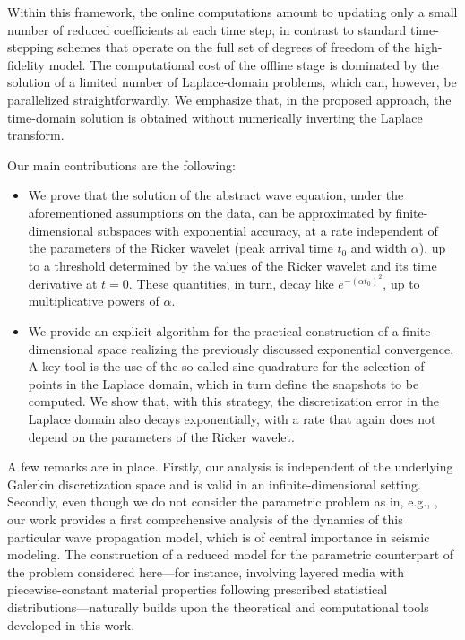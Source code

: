 Within this framework, the online computations amount to updating only a small
number of reduced coefficients at each time step, in contrast to standard
time-stepping schemes that operate on the full set of degrees of freedom of the
high-fidelity model.
The computational cost of the offline stage is dominated by the solution of a
limited number of Laplace-domain problems, which can, however, be parallelized straightforwardly.
We emphasize that, in the proposed approach, the time-domain solution is obtained
without numerically inverting the Laplace transform.


Our main contributions are the following:
\begin{itemize}
    \item[(i)]
    We prove that the solution of the abstract wave equation, under the aforementioned
    assumptions on the data, can be approximated by finite-dimensional subspaces
    with exponential accuracy, at a rate independent of the parameters of the Ricker
    wavelet (peak arrival time $t_0$ and width $\alpha$), up to a threshold determined by the
    values of the Ricker wavelet and its time derivative at $t=0$.
    These quantities, in turn, decay like $e^{-(\alpha t_0)^2}$, up to multiplicative powers of $\alpha$. 
    \item[(ii)]
    We provide an explicit algorithm for the practical construction of a finite-dimensional
    space realizing the previously discussed exponential convergence.
    A key tool is the use of the so-called sinc quadrature for the selection of points
    in the Laplace domain, which in turn define the snapshots to be computed.
    We show that, with this strategy, the discretization error in the Laplace domain
    also decays exponentially, with a rate that again does not depend on the parameters
    of the Ricker wavelet.
\end{itemize}

A few remarks are in place. Firstly, our analysis is independent of the underlying Galerkin
discretization space and is valid in an infinite-dimensional setting. Secondly, even though we do
not consider the parametric problem as in, e.g., \cite{hawkins2025model}, our work provides a first
comprehensive analysis of the dynamics of this particular wave propagation model, which is of
central importance in seismic modeling.
The construction of a reduced model for the parametric counterpart
of the problem considered here---for instance, involving layered media with
piecewise-constant material properties following prescribed statistical
distributions---naturally builds upon the theoretical and computational tools developed in this work.


